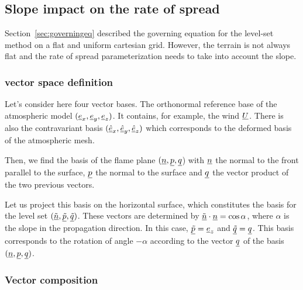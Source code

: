\subsection{Slope impact on the rate of spread}

Section~\ref{sec:governingeq} described the governing equation for the level-set method on a flat and uniform cartesian grid.
However, the terrain is not always flat and the rate of spread parameterization needs to take into account the slope.

\subsubsection{vector space definition}

Let's consider here four vector bases. The orthonormal reference base of the atmospheric model $(\underline{e}_x, \underline{e}_y, \underline{e}_z)$. It contains, for example, the wind $\underline{U}$. There is also the contravariant basis $(\underline{\hat e}_x, \underline{\hat e}_y , \underline{\hat e}_z)$ which corresponds to the deformed basis of the atmospheric mesh. 

\smallskip

Then, we find the basis of the flame plane $(\underline{n}, \underline{p}, \underline{q}$) with $\underline{n}$ the normal to the front parallel to the surface, $\underline{p}$ the normal to the surface and $\underline{q}$ the vector product of the two previous vectors.

\smallskip

Let us project this basis on the horizontal surface, which constitutes the basis for the level set $(\underline{\tilde n}, \underline{\tilde p}, \underline{\tilde q})$. These vectors are determined by $\underline{\tilde n} \cdot \underline{n} = \cos \alpha$, where $\alpha$ is the slope in the propagation direction. In this case, $\underline{\tilde p} = \underline{e}_z$ and $\underline{\tilde q} = \underline{q}$. This basis corresponds to the rotation of angle $- \alpha$ according to the vector $\underline{q}$ of the basis $(\underline{n}, \underline{p}, \underline{q})$.

\subsubsection{Vector composition}

